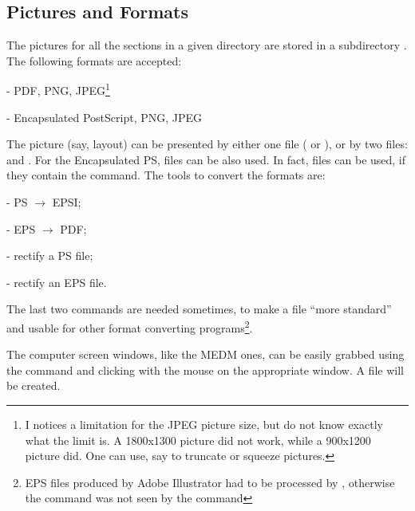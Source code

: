 \documentclass[12pt,letterpaper]{article}
\begin{document}
\subsection{Pictures and Formats}
\label{sec:pictures}

  The pictures for all the sections in a given directory are stored
  in a subdirectory . The following formats are accepted:
  
  \begin{list}{}{\setlength{\itemsep}{-0.15cm}}
    \item {} - PDF, PNG, JPEG\footnote{
           I notices a limitation for the JPEG picture size, but
           do not know exactly what the limit is. A 1800x1300 picture
           did not work, while a 900x1200 picture did. One can use, say 
            to truncate or squeeze pictures.}
    \item {} - Encapsulated PostScript, PNG, JPEG 
  \end{list}
  The picture (say, layout) can be presented by either one
  file ( or ), or by two
  files:  and .
  For the Encapsulated PS,  files can be also used.
  In fact,  files can be used, if they contain
  the  command. The tools to convert
  the formats are:
  \begin{list}{}{\setlength{\itemsep}{-0.15cm}}
    \item {} - PS $\rightarrow$ EPSI;
    \item {} - EPS $\rightarrow$ PDF;
    \item {} - rectify a PS file;
    \item {} - rectify an EPS file.
  \end{list}

  The last two commands are needed sometimes, to
  make a file ``more standard'' and usable for other
  format converting programs\footnote{EPS files produced by
  Adobe Illustrator had to be processed by ,
  otherwise the  command was not seen by
  the  command}.
  
  The computer screen windows, like the MEDM ones, can be easily
  grabbed using the command  and clicking
  with the mouse on the appropriate window. A file 
  will be created.
\end{document}
